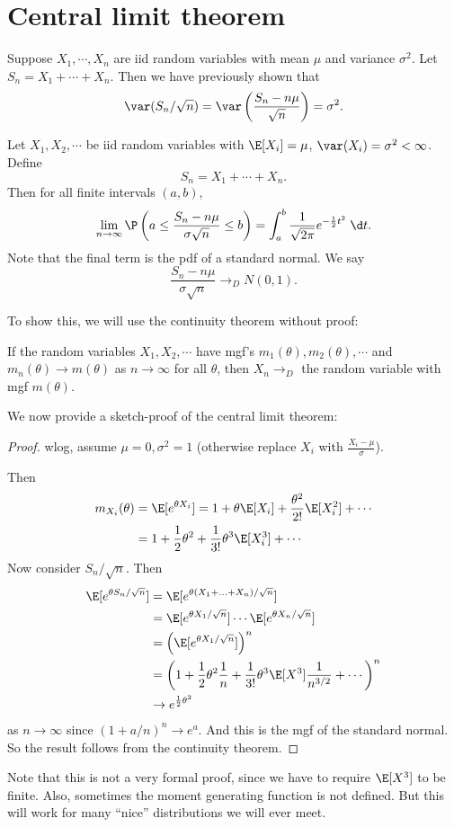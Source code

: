 \documentclass[a4paper]{article}
\begin{document}
\section{Central limit theorem}
Suppose $X_1, \cdots, X_n$ are iid random variables with mean $\mu$ and variance $\sigma^2$. Let $S_n = X_1 + \cdots + X_n$. Then we have previously shown that
\[
  \var(S_n/\sqrt{n}) = \var\left(\frac{S_n - n \mu}{\sqrt{n}}\right) = \sigma^2.
\]
\begin{thm}
  Let $X_1, X_2, \cdots$ be iid random variables with $\E[X_i] = \mu$, $\var(X_i) = \sigma^2 < \infty$. Define
  \[
    S_n = X_1 + \cdots + X_n.
  \]
  Then for all finite intervals $(a, b)$,
  \[
    \lim_{n \to \infty}\P\left(a \leq \frac{S_{n} - n\mu}{\sigma\sqrt{n}} \leq b\right) = \int_a^b \frac{1}{\sqrt{2\pi}} e^{-\frac{1}{2}t^2}\;\d t.
  \]
  Note that the final term is the pdf of a standard normal. We say
  \[
    \frac{S_n - n\mu}{\sigma\sqrt{n}} \to_{D} N(0, 1).
  \]
\end{thm}

To show this, we will use the continuity theorem without proof:
\begin{thm}
  If the random variables $X_1, X_2, \cdots$ have mgf's $m_1(\theta), m_2(\theta), \cdots$ and $m_n(\theta) \to m(\theta)$ as $n\to\infty$ for all $\theta$, then $X_n \to_D $ the random variable with mgf $m(\theta)$.
\end{thm}

We now provide a sketch-proof of the central limit theorem:
\begin{proof}
  wlog, assume $\mu = 0, \sigma^2 = 1$ (otherwise replace $X_i$ with $\frac{X_i - \mu}{\sigma}$).

  Then
  \begin{align*}
    m_{X_i}(\theta) &= \E[e^{\theta X_i}] = 1 + \theta \E[X_i] + \frac{\theta^2}{2!} \E[X_i^2] + \cdots\\
    &=1 + \frac{1}{2}\theta^2 + \frac{1}{3!}\theta^3 \E[X_i^3] + \cdots
  \end{align*}
  Now consider $S_n/\sqrt{n}$. Then
  \begin{align*}
    \E[e^{\theta S_n/\sqrt{n}}] &= \E[e^{\theta(X_1 + \ldots + X_n)/\sqrt{n}}]\\
    &= \E[e^{\theta X_1/\sqrt{n}}] \cdots \E[e^{\theta X_n/\sqrt{n}}]\\
    &= \left(\E[e^{\theta X_1/\sqrt{n}}]\right)^n\\
    &= \left(1 + \frac{1}{2}\theta^2 \frac{1}{n} + \frac{1}{3!}\theta^3 \E[X^3]\frac{1}{n^{3/2}} + \cdots\right)^{n}\\
    &\to e^{\frac{1}{2}\theta^2}
  \end{align*}
  as $n \to \infty$ since $(1 + a/n)^n \to e^a$. And this is the mgf of the standard normal. So the result follows from the continuity theorem.
\end{proof}
Note that this is not a very formal proof, since we have to require $\E[X^3]$ to be finite. Also, sometimes the moment generating function is not defined. But this will work for many ``nice'' distributions we will ever meet.
\end{document}
